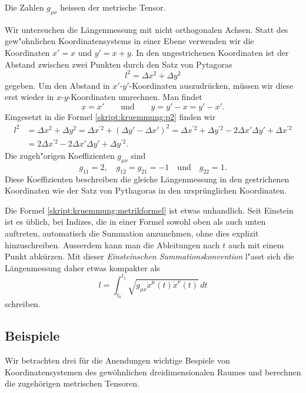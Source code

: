 \begin{definition}
Die Zahlen $g_{\mu\nu}$ heissen der metrische Tensor.
\end{definition}

%
%
\begin{beispiel}
Wir untersuchen die Längenmessung mit nicht orthogonalen Achsen.
Statt des gew"ohnlichen Koordinatensystems in einer Ebene verwenden
wir die Koordinaten $x'=x$ und $y'=x+y$.
In den ungestrichenen Koordinaten ist der Abstand zwischen zwei
Punkten durch den Satz von Pytagoras
\begin{equation}
l^2 = \Delta x^2 + \Delta y^2
\label{skript:kruemmung:p2}
\end{equation}
gegeben.
Um den Abstand in $x'$-$y'$-Koordinaten auszudrücken, müssen wir diese
erst wieder in $x$-$y$-Koordinaten umrechnen. 
Man findet
\[
x=x'
\qquad\text{und}\qquad
y=y'-x=y'-x'.
\]
Eingesetzt in die Formel \eqref{skript:kruemmung:p2} finden wir
\begin{align*}
l^2
&=
\Delta x^2 + \Delta y^2
=
\Delta x^{\prime 2}
+
(\Delta y'- \Delta x')^2
=
\Delta x^{\prime 2}
+
\Delta y^{\prime 2}-2\Delta x'\Delta y' + \Delta x^{\prime 2}
\\
&= 2 \Delta x^{\prime 2} - 2 \Delta x'\Delta y'+\Delta y^{\prime 2}.
\end{align*}
Die zugeh"origen Koeffizienten $g_{\mu\nu}$ sind
\[
g_{11} = 2,\quad
g_{12}=g_{21}=-1\quad\text{und}\quad
g_{22}=1.
\]
Diese Koeffizienten beschreiben die gleiche Längenmessung in den 
gestrichenen Koordinaten wie der Satz von Pythagoras in den ursprünglichen
Koordinaten.
\end{beispiel}

Die Formel \eqref{skript:kruemmung:metrikformel} ist etwas unhandlich.
Seit Einstein ist es üblich, bei Indizes, die in einer Formel sowohl oben
als auch unten auftreten, automatisch die Summation anzunehmen, ohne
dies explizit hinzuschreiben.
Ausserdem kann man die Ableitungen nach $t$ auch mit einem Punkt abkürzen.
Mit dieser {\em Einsteinschen Summationskonvention} l"asst sich die
Längenmessung daher etwas kompakter als
\[
l=\int_{t_0}^{t_1} \sqrt{g_{\mu\nu}\dot x^{\mu}(t) \dot x^{\nu}(t)}\,dt
\]
schreiben.

\subsection{Beispiele}
Wir betrachten drei für die Anendungen wichtige Bespiele von
Koordinatensystemen des gewöhnlichen dreidimensionalen Raumes
und berechnen die zugehörigen metrischen Tensoren.

